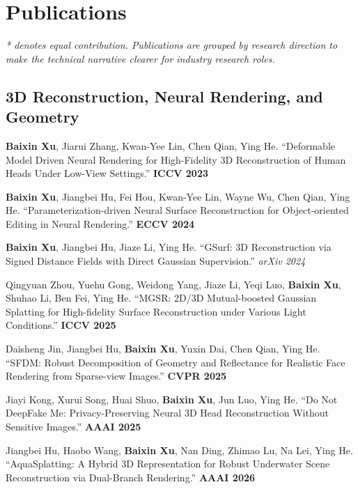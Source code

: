 \documentclass[11pt,letterpaper]{report}
\newcommand{\listitemspace}{0.25em}
\renewenvironment{itemize}
{\begin{list}{}{\setlength{\leftmargin}{0em}
                \setlength{\parskip}{0em}
                \setlength{\itemsep}{\listitemspace}
                \setlength{\parsep}{\listitemspace}}}
{\end{list}}
\begin{document}
    \section*{Publications}

    \textit{* denotes equal contribution. Publications are grouped by research direction to make the technical narrative clearer for industry research roles.}

    \subsection*{3D Reconstruction, Neural Rendering, and Geometry}
    \begin{itemize}
        \item \textbf{Baixin Xu}, Jiarui Zhang, Kwan-Yee Lin, Chen Qian, Ying He. \enquote{Deformable Model Driven Neural Rendering for High-Fidelity 3D Reconstruction of Human Heads Under Low-View Settings.} \textbf{ICCV 2023}

        \item \textbf{Baixin Xu}, Jiangbei Hu, Fei Hou, Kwan-Yee Lin, Wayne Wu, Chen Qian, Ying He. \enquote{Parameterization-driven Neural Surface Reconstruction for Object-oriented Editing in Neural Rendering.} \textbf{ECCV 2024}

        \item \textbf{Baixin Xu}, Jiangbei Hu, Jiaze Li, Ying He. \enquote{GSurf: 3D Reconstruction via Signed Distance Fields with Direct Gaussian Supervision.} \textit{arXiv 2024}

        \item Qingyuan Zhou, Yuehu Gong, Weidong Yang, Jiaze Li, Yeqi Luo, \textbf{Baixin Xu}, Shuhao Li, Ben Fei, Ying He. \enquote{MGSR: 2D/3D Mutual-boosted Gaussian Splatting for High-fidelity Surface Reconstruction under Various Light Conditions.} \textbf{ICCV 2025}

        \item Daisheng Jin, Jiangbei Hu, \textbf{Baixin Xu}, Yuxin Dai, Chen Qian, Ying He. \enquote{SFDM: Robust Decomposition of Geometry and Reflectance for Realistic Face Rendering from Sparse-view Images.} \textbf{CVPR 2025}

        \item Jiayi Kong, Xurui Song, Huai Shuo, \textbf{Baixin Xu}, Jun Luo, Ying He. \enquote{Do Not DeepFake Me: Privacy-Preserving Neural 3D Head Reconstruction Without Sensitive Images.} \textbf{AAAI 2025}

        \item Jiangbei Hu, Haobo Wang, \textbf{Baixin Xu}, Nan Ding, Zhimao Lu, Na Lei, Ying He. \enquote{AquaSplatting: A Hybrid 3D Representation for Robust Underwater Scene Reconstruction via Dual-Branch Rendering.} \textbf{AAAI 2026}


\end{itemize}
\end{document}
